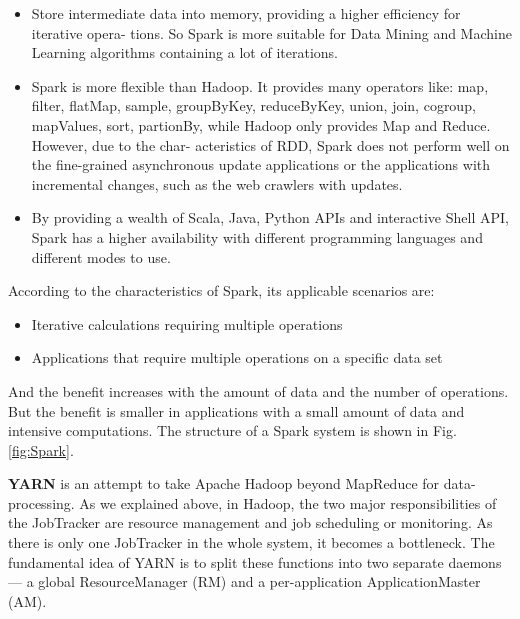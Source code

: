 \documentclass[	DIV=calc,%
							paper=a4,%
							fontsize=11pt,%
							twocolumn]{scrartcl}	 					%
\begin{document}
\begin{itemize}

\item Store intermediate data into memory, providing a higher efficiency for iterative opera- tions. So Spark is more suitable for Data Mining and Machine Learning algorithms containing a lot of iterations.

\item Spark is more flexible than Hadoop. It provides many operators like: map, filter, flatMap, sample, groupByKey, reduceByKey, union, join, cogroup, mapValues, sort, partionBy, while Hadoop only provides Map and Reduce. However, due to the char- acteristics of RDD, Spark does not perform well on the fine-grained asynchronous update applications or the applications with incremental changes, such as the web crawlers with updates.

\item By providing a wealth of Scala, Java, Python APIs and interactive Shell API, Spark has a higher availability with different programming languages and different modes to use.

\end{itemize}

According to the characteristics of Spark, its applicable scenarios are:

\begin{itemize}
\item Iterative calculations requiring multiple operations

\item Applications that require multiple operations on a specific data set

\end{itemize}

And the benefit increases with the amount of data and the number of operations. But the benefit is smaller in applications with a small amount of data and intensive computations.
The structure of a Spark system is shown in Fig. \ref{fig:Spark}.

\textbf{YARN} \cite{3} is an attempt to take Apache Hadoop beyond MapReduce for data-processing. As we explained above, in Hadoop, the two major responsibilities of the JobTracker are resource management and job scheduling or monitoring. As there is only one JobTracker in the whole system, it becomes a bottleneck. The fundamental idea of YARN is to split these functions into two separate daemons --- a global ResourceManager (RM) and a per-application ApplicationMaster (AM).
\end{document}
